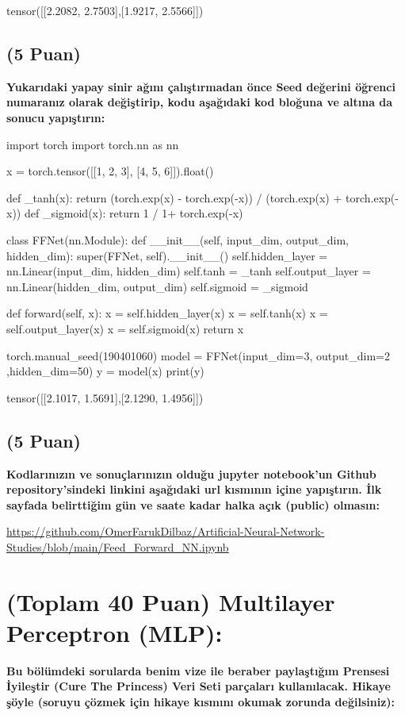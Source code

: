 \documentclass[11pt]{article}
\begin{document}
tensor([[2.2082, 2.7503],[1.9217, 2.5566]])

\subsection{(5 Puan)} \textbf{Yukarıdaki yapay sinir ağını çalıştırmadan önce Seed değerini öğrenci numaranız olarak değiştirip, kodu aşağıdaki kod bloğuna ve altına da sonucu yapıştırın:}

\begin{python}
import torch
import torch.nn as nn

x = torch.tensor([[1, 2, 3], [4, 5, 6]]).float()

def _tanh(x):
    return (torch.exp(x) - torch.exp(-x)) / (torch.exp(x) + torch.exp(-x))
def _sigmoid(x):
    return 1 / 1+ torch.exp(-x)

class FFNet(nn.Module):
    def __init__(self, input_dim, output_dim, hidden_dim):
        super(FFNet, self).__init__()
        self.hidden_layer = nn.Linear(input_dim, hidden_dim)
        self.tanh = _tanh 
        self.output_layer = nn.Linear(hidden_dim, output_dim)
        self.sigmoid = _sigmoid
        
    def forward(self, x):
        x = self.hidden_layer(x)
        x = self.tanh(x)
        x = self.output_layer(x)
        x = self.sigmoid(x)
        return x

torch.manual_seed(190401060)
model = FFNet(input_dim=3,  output_dim=2 ,hidden_dim=50)
y = model(x)
print(y)
\end{python}

tensor([[2.1017, 1.5691],[2.1290, 1.4956]])
\subsection{(5 Puan)} \textbf{Kodlarınızın ve sonuçlarınızın olduğu jupyter notebook'un Github repository'sindeki linkini aşağıdaki url kısmının içine yapıştırın. İlk sayfada belirttiğim gün ve saate kadar halka açık (public) olmasın:}

\url{https://github.com/OmerFarukDilbaz/Artificial-Neural-Network-Studies/blob/main/Feed_Forward_NN.ipynb}

\section{(Toplam 40 Puan) Multilayer Perceptron (MLP):} 
\textbf{Bu bölümdeki sorularda benim vize ile beraber paylaştığım Prensesi İyileştir (Cure The Princess) Veri Seti parçaları kullanılacak. Hikaye şöyle (soruyu çözmek için hikaye kısmını okumak zorunda değilsiniz):} 
\end{document}
